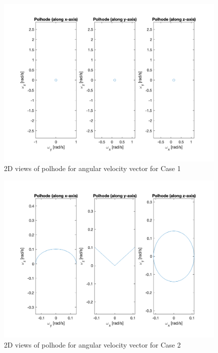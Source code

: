 \begin{figure}[H]
\centering
\includegraphics[scale=0.6]{Images/ps2_problem9_p8_x.png}
\caption{2D views of polhode for angular velocity vector for Case 1}
\label{fig:ps2_problem9_p8_x}
\end{figure}

\begin{figure}[H]
\centering
\includegraphics[scale=0.6]{Images/ps2_problem9_p8_y.png}
\caption{2D views of polhode for angular velocity vector for Case 2}
\label{fig:ps2_problem9_p8_y}
\end{figure}

